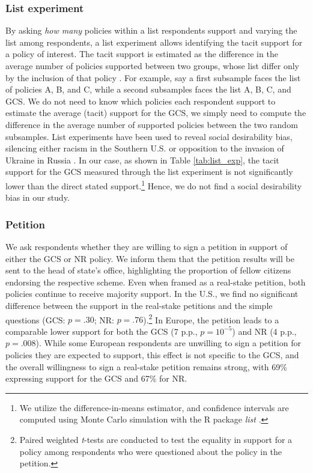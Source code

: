 \subsubsection{List experiment}\label{subsubsec:list_exp} %

By asking \textit{how many} policies within a list respondents support and varying the list among respondents, a list experiment allows identifying the tacit support for a policy of interest. The tacit support is estimated as the difference in the average number of policies supported between two groups, whose list differ only by the inclusion of that policy \citep{hainmueller_causal_2014}. %
For example, say a first subsample faces the list of policies A, B, and C, while a second subsamples faces the list A, B, C, and GCS. We do not need to know which policies each respondent support to estimate the average (tacit) support for the GCS, we simply need to compute the difference in the average number of supported policies between the two random subsamples. 
List experiments have been used to reveal social desirability bias, silencing either racism in the Southern U.S. \citep{kuklinski_racial_1997} or opposition to the invasion of Ukraine in Russia \citep{chapkovski_solid_2022}. %
In our case, as shown in Table \ref{tab:list_exp}, the tacit support for the GCS measured through the list experiment is not significantly lower than the direct stated support.\footnote{We utilize the difference-in-means estimator, and confidence intervals are computed using Monte Carlo simulation with the R package \textit{list} \citep{imai_multivariate_2011}.} Hence, we do not find a social desirability bias in our study.


\subsubsection{Petition}\label{subsubsec:petition} %

We ask respondents whether they are willing to sign a petition in support of either the GCS or NR policy. We inform them that the petition results will be sent to the head of state's office, highlighting the proportion of fellow citizens endorsing the respective scheme. Even when framed as a real-stake petition, both policies continue to receive majority support. In the U.S., we find no significant difference between the support in the real-stake petitions and the simple questions (GCS: $p=.30$; NR: $p=.76$).\footnote{Paired weighted \textit{t}-tests are conducted to test the equality in support for a policy among respondents who were questioned about the policy in the petition.} In Europe, the petition leads to a comparable lower support for both the GCS (7 p.p., $p=10^{-5}$) and NR (4 p.p., $p = .008$). While some European respondents are unwilling to sign a petition for policies they are expected to support, this effect is not specific to the GCS, and the overall willingness to sign a real-stake petition remains strong, with 69\% expressing support for the GCS and 67\% for NR.

